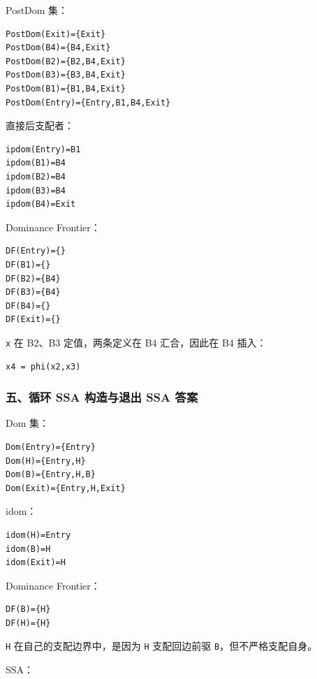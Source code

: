 \documentclass[UTF8]{ctexart}
\begin{document}
PostDom 集：

\begin{Verbatim}[fontsize=\small,breaklines=true]
PostDom(Exit)={Exit}
PostDom(B4)={B4,Exit}
PostDom(B2)={B2,B4,Exit}
PostDom(B3)={B3,B4,Exit}
PostDom(B1)={B1,B4,Exit}
PostDom(Entry)={Entry,B1,B4,Exit}
\end{Verbatim}

直接后支配者：

\begin{Verbatim}[fontsize=\small,breaklines=true]
ipdom(Entry)=B1
ipdom(B1)=B4
ipdom(B2)=B4
ipdom(B3)=B4
ipdom(B4)=Exit
\end{Verbatim}

Dominance Frontier：

\begin{Verbatim}[fontsize=\small,breaklines=true]
DF(Entry)={}
DF(B1)={}
DF(B2)={B4}
DF(B3)={B4}
DF(B4)={}
DF(Exit)={}
\end{Verbatim}

\texttt{x} 在 B2、B3 定值，两条定义在 B4 汇合，因此在 B4 插入：

\begin{Verbatim}[fontsize=\small,breaklines=true]
x4 = phi(x2,x3)
\end{Verbatim}

\subsubsection*{五、循环 SSA 构造与退出 SSA 答案}

Dom 集：

\begin{Verbatim}[fontsize=\small,breaklines=true]
Dom(Entry)={Entry}
Dom(H)={Entry,H}
Dom(B)={Entry,H,B}
Dom(Exit)={Entry,H,Exit}
\end{Verbatim}

idom：

\begin{Verbatim}[fontsize=\small,breaklines=true]
idom(H)=Entry
idom(B)=H
idom(Exit)=H
\end{Verbatim}

Dominance Frontier：

\begin{Verbatim}[fontsize=\small,breaklines=true]
DF(B)={H}
DF(H)={H}
\end{Verbatim}

\texttt{H} 在自己的支配边界中，是因为 \texttt{H} 支配回边前驱 \texttt{B}，但不严格支配自身。

SSA：
\end{document}
